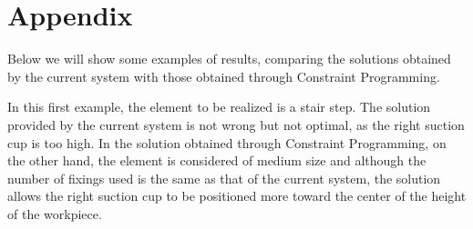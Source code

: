 \documentclass[runningheads]{llncs}
\begin{document}
	
	





\newpage
\appendix

\section{Appendix}
Below we will show some examples of results, comparing the solutions obtained by the current system with those obtained through Constraint Programming.

In this first example, the element to be realized is a stair step. The solution provided by the current system is not wrong but not optimal, as the right suction cup is too high. In the solution obtained through Constraint Programming, on the other hand, the element is considered of medium size and although the number of fixings used is the same as that of the current system, the solution allows the right suction cup to be positioned more toward the center of the height of the workpiece.
\end{document}

